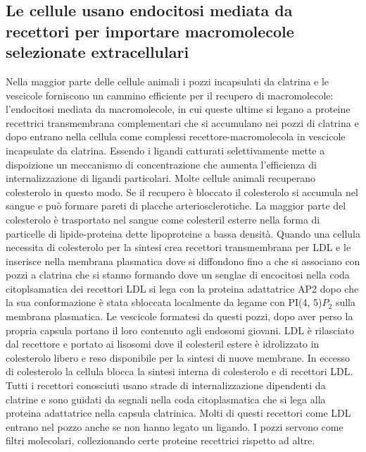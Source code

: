 \subsection{Le cellule usano endocitosi mediata da recettori per importare macromolecole selezionate extracellulari}
Nella maggior parte delle cellule animali i pozzi incapsulati da clatrina e le vescicole forniscono un cammino efficiente per il recupero di macromolecole: l'endocitosi mediata da
macromolecole, in cui queste ultime si legano a proteine recettrici transmembrana complementari che si accumulano nei pozzi di clatrina e dopo entrano nella cellula come complessi
recettore-macromolecola in vescicole incapsulate da clatrina. Essendo i ligandi catturati selettivamente mette a dispoizione un meccanismo di concentrazione che aumenta l'efficienza di 
internalizzazione di ligandi particolari. Molte cellule animali recuperano colesterolo in questo modo. Se il recupero \`e bloccato il colesterolo si accumula nel sangue e pu\`o formare
pareti di placche arteriosclerotiche. La maggior parte del colesterolo \`e trasportato nel sangue come colesteril esterre nella forma di particelle di lipide-proteina dette lipoproteine
a bassa densit\`a. Quando una cellula necessita di colesterolo per la sintesi crea recettori transmembrana per LDL e le inserisce nella membrana plasmatica dove si diffondono fino a che
si associano con pozzi a clatrina che si stanno formando dove un senglae di encocitosi nella coda citoplsamatica dei recettori LDL si lega con la proteina adattatrice AP2 dopo che la
sua conformazione \`e stata sbloccata localmente da legame con PI(4, 5)$P_2$ sulla membrana plasmatica. Le vescicole formatesi da questi pozzi, dopo aver perso la propria capsula 
portano il loro contenuto agli endosomi giovani. LDL \`e rilasciato dal recettore e portato ai lisosomi dove il colesteril estere \`e idrolizzato in colesterolo libero e reso disponibile
per la sintesi di nuove membrane. In eccesso di colesterolo la cellula blocca la sintesi interna di colesterolo e di recettori LDL. Tutti i recettori conosciuti usano strade di 
internalizzazione dipendenti da clatrine e sono guidati da segnali nella coda citoplasmatica che si lega alla proteina adattatrice nella capsula clatrinica. Molti di questi recettori 
come LDL entrano nel pozzo anche se non hanno legato un ligando. I pozzi servono come filtri molecolari, collezionando certe proteine recettrici rispetto ad altre. 
